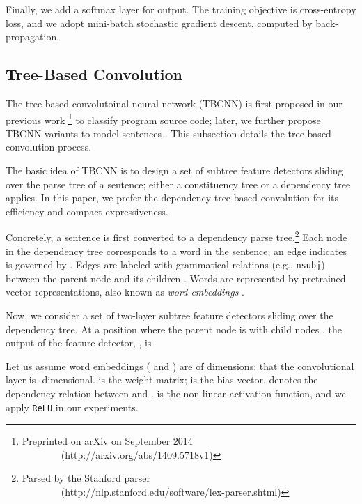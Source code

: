 \documentclass[11pt]{article}
\begin{document}
Finally, we add a softmax layer for output. The training objective is cross-entropy loss, and we adopt mini-batch stochastic gradient descent, computed by back-propagation. 


\vspace{-.1cm}
\subsection{Tree-Based Convolution}

\vspace{-.1cm}
The tree-based convolutoinal neural network (TBCNN) is first proposed in our previous work \cite{programTBCNN}\footnote{Preprinted on arXiv on September 2014\\ {\color{white}} \ \ \ \ \ \ \  \ (http://arxiv.org/abs/1409.5718v1)
} to classify program source code; later, we further propose TBCNN variants to model sentences \cite{sentenceTBCNN}. 
This subsection details the tree-based convolution process.

The basic idea of TBCNN is to design a set of subtree feature detectors sliding over the parse tree of a sentence; either a constituency tree or a dependency tree applies. In this paper, we prefer the dependency tree-based convolution for its efficiency and compact expressiveness.

Concretely, a sentence is first converted to a dependency parse tree.\footnote{Parsed by the Stanford parser\\ {\color{white}} \ \ \ \ \ \ \  \ (http://nlp.stanford.edu/software/lex-parser.shtml)
} Each node in the dependency tree corresponds to a word in the sentence; an edge  indicates  is governed by . Edges are labeled with grammatical relations (e.g., {\tt nsubj}) between the parent node and its children \cite{dependency}. Words are represented by pretrained vector representations, also known as \textit{word embeddings} \cite{word2vec}.
 
Now, we consider a set of two-layer subtree feature detectors sliding over the dependency tree. At a position where the parent node is  with child nodes , the output of the feature detector, , is 

\vspace{-1.1cm}


\vspace{-.2cm}
Let us assume word embeddings ( and ) are of  dimensions; that the convolutional layer  is -dimensional.  is the weight matrix;  is the bias vector.  denotes the dependency relation between  and .  is the non-linear activation function, and we apply {\tt ReLU} in our experiments.
\end{document}
